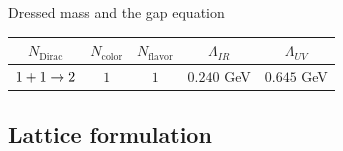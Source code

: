 \begin{frame}[allowframebreaks]{Dressed mass and the gap equation}
	\vspace{-1em}

	\begin{table}[!bp]
	  \centering
	  \label{tab:NJL1-analytical-solution-parameters}
	  \begin{tabular}{ c c c c c }
	    \hline
	    $N_\text{Dirac}$ & $N_\text{color}$ & $N_\text{flavor}$ &
	    $\Lambda_{IR}$ & $\Lambda_{UV}$ \\
	    \hline
	    \hline
	    $1+1 \rightarrow 2$ & $1$ & $1$ & $0.240$ GeV & $0.645$ GeV \\
	    \hline
	  \end{tabular}
	\end{table}

\end{frame}



\subsection{Lattice formulation}


